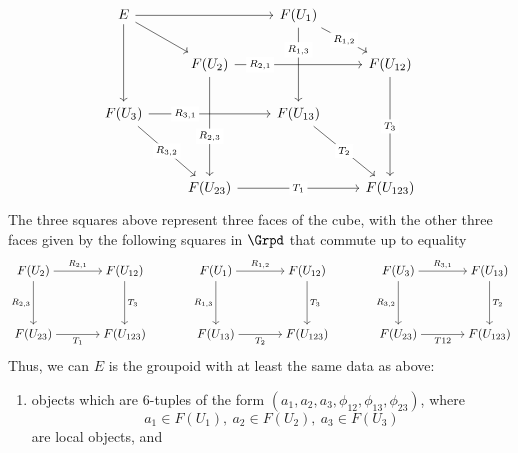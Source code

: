 \begin{answer}
    \[\begin{tikzcd}
    	E && {F(U_1)} & \\
    	& {F(U_2)} && {F(U_{12})} \\
    	{F(U_3)} && {F(U_{13})} \\
    	\\
    	& {F(U_{23})} && {F(U_{123})}
    	\arrow[from=1-1, to=1-3]
    	\arrow[from=1-1, to=2-2]
    	\arrow[from=1-1, to=3-1]
    	\arrow["{R_{1,2}}"{description}, from=1-3, to=2-4]
    	\arrow["{{R_{1,3}}}"{description, pos=0.3}, from=1-3, to=3-3]
    	\arrow["{R_{2,1}}"{description, pos=0.2}, from=2-2, to=2-4]
    	\arrow["{{R_{2,3}}}"{description, pos=0.6}, from=2-2, to=5-2]
    	\arrow["{{T_3}}"{description}, from=2-4, to=5-4]
    	\arrow["{{R_{3,1}}}"{description, pos=0.3}, from=3-1, to=3-3]
    	\arrow["{{R_{3,2}}}"{description}, from=3-1, to=5-2]
    	\arrow["{{T_2}}"{description}, from=3-3, to=5-4]
    	\arrow["{{T_1}}"{description}, from=5-2, to=5-4]
    \end{tikzcd}\]
    The three squares above represent three faces of the cube, with the other three faces given by the following squares in $\Grpd$ that commute up to equality
    \[\begin{tikzcd}[cramped,column sep=scriptsize]
    	{F(U_2)} && {F(U_{12})} && {F(U_1)} && {F(U_{12})} && {F(U_3)} && {F(U_{13})} \\
    	\\
    	{F(U_{23})} && {F(U_{123})} && {F(U_{13})} && {F(U_{123})} && {F(U_{23})} && {F(U_{123})}
    	\arrow["{{R_{2,1}}}", from=1-1, to=1-3]
    	\arrow["{{R_{2,3}}}"', from=1-1, to=3-1]
    	\arrow["{{T_3}}", from=1-3, to=3-3]
    	\arrow["{{R_{1,2}}}", from=1-5, to=1-7]
    	\arrow["{{R_{1,3}}}"', from=1-5, to=3-5]
    	\arrow["{{T_3}}", from=1-7, to=3-7]
    	\arrow["{{R_{3,1}}}", from=1-9, to=1-11]
    	\arrow["{{R_{3,2}}}"', from=1-9, to=3-9]
    	\arrow["{{T_2}}", from=1-11, to=3-11]
    	\arrow["{{T_1}}"', from=3-1, to=3-3]
    	\arrow["{{T_2}}"', from=3-5, to=3-7]
    	\arrow["{{T12}}"', from=3-9, to=3-11]
    \end{tikzcd}\]
    Thus, we can $E$ is the groupoid with at least the same data as above:
    \begin{enumerate}
        \item objects which are $6$-tuples of the form $(a_1, a_2, a_3, \phi_{12}, \phi_{13}, \phi_{23})$, where
        $$
        a_1 \in F(U_1), \ a_2 \in F(U_2), \ a_3 \in F(U_3)
        $$
        are local objects, and
        \begin{align*}

\end{align*}
\end{enumerate}
\end{answer}
